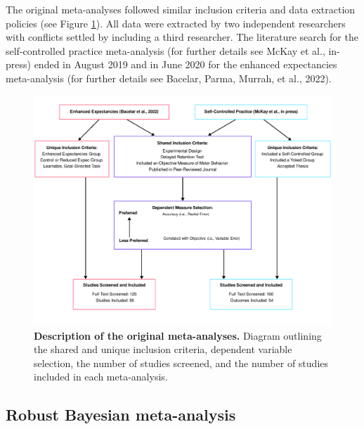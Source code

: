 \documentclass[
  man, donotrepeattitle,floatsintext]{apa7}
\begin{document}
The original meta-analyses followed similar inclusion criteria and data extraction policies (see Figure \ref{fig:fig1}). All data were extracted by two independent researchers with conflicts settled by including a third researcher. The literature search for the self-controlled practice meta-analysis (for further details see McKay et al., in-press) ended in August 2019 and in June 2020 for the enhanced expectancies meta-analysis (for further details see Bacelar, Parma, Murrah, et al., 2022).

\clearpage

\begin{figure}

{\centering \includegraphics{../../figs/fig1} 

}

\caption{\linespread{0.96}\normalfont\footnotesize\textbf{Description of the original meta-analyses.} Diagram outlining the shared and unique inclusion criteria, dependent variable selection, the number of studies screened, and the number of studies included in each meta-analysis.}\label{fig:fig1}
\end{figure}



\clearpage

\linespread{1.75}
\normalsize

\hypertarget{robust-bayesian-meta-analysis}{%
\subsection{Robust Bayesian meta-analysis}\label{robust-bayesian-meta-analysis}}
\end{document}
